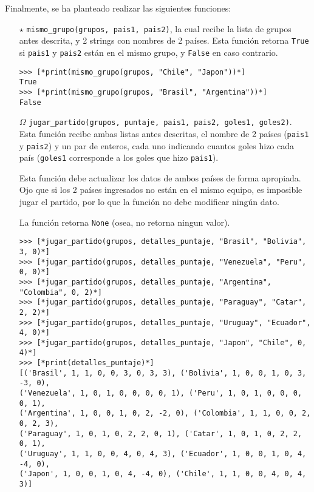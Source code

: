 Finalmente, se ha planteado realizar las siguientes funciones:

\begin{enumerate}
    \item[$\star$] \texttt{mismo\_grupo(grupos, pais1, pais2)}, la cual recibe la lista de grupos antes descrita, y 2 strings con nombres de 2 países. Esta función retorna \texttt{True} si \texttt{pais1} y \texttt{pais2} están en el mismo grupo, y \texttt{False} en caso contrario.

\begin{lstlisting}[style=consola]
>>> [*print(mismo_grupo(grupos, "Chile", "Japon"))*]
True
>>> [*print(mismo_grupo(grupos, "Brasil", "Argentina"))*]
False
\end{lstlisting}

    
    \item[$\Omega$] \texttt{jugar\_partido(grupos, puntaje, pais1, pais2, goles1, goles2)}. Esta función recibe ambas listas antes descritas, el nombre de 2 países (\texttt{pais1} y  \texttt{pais2}) y un par de enteros, cada uno indicando cuantos goles hizo cada país (\texttt{goles1} corresponde a los goles que hizo \texttt{pais1}).
    
    Esta función debe actualizar los datos de ambos países de forma apropiada. Ojo que si los 2 países ingresados no están en el mismo equipo, es imposible jugar el partido, por lo que la función no debe modificar ningún dato.
    
    La función retorna \texttt{None} (osea, no retorna ningun valor).
    

\begin{lstlisting}[style=consola]
>>> [*jugar_partido(grupos, detalles_puntaje, "Brasil", "Bolivia", 3, 0)*]
>>> [*jugar_partido(grupos, detalles_puntaje, "Venezuela", "Peru", 0, 0)*]
>>> [*jugar_partido(grupos, detalles_puntaje, "Argentina", "Colombia", 0, 2)*]
>>> [*jugar_partido(grupos, detalles_puntaje, "Paraguay", "Catar", 2, 2)*]
>>> [*jugar_partido(grupos, detalles_puntaje, "Uruguay", "Ecuador", 4, 0)*]
>>> [*jugar_partido(grupos, detalles_puntaje, "Japon", "Chile", 0, 4)*]
>>> [*print(detalles_puntaje)*]
[('Brasil', 1, 1, 0, 0, 3, 0, 3, 3), ('Bolivia', 1, 0, 0, 1, 0, 3, -3, 0),
('Venezuela', 1, 0, 1, 0, 0, 0, 0, 1), ('Peru', 1, 0, 1, 0, 0, 0, 0, 1),
('Argentina', 1, 0, 0, 1, 0, 2, -2, 0), ('Colombia', 1, 1, 0, 0, 2, 0, 2, 3), 
('Paraguay', 1, 0, 1, 0, 2, 2, 0, 1), ('Catar', 1, 0, 1, 0, 2, 2, 0, 1),
('Uruguay', 1, 1, 0, 0, 4, 0, 4, 3), ('Ecuador', 1, 0, 0, 1, 0, 4, -4, 0),
('Japon', 1, 0, 0, 1, 0, 4, -4, 0), ('Chile', 1, 1, 0, 0, 4, 0, 4, 3)]
\end{lstlisting}
    

\end{enumerate}
